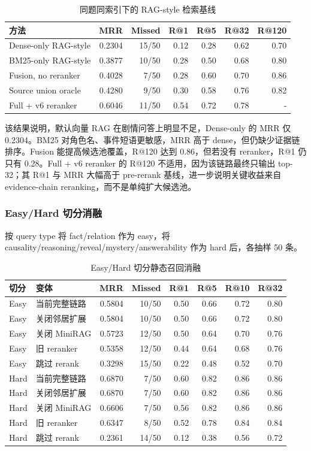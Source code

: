 \documentclass[UTF8,a4paper,12pt]{ctexart}
\begin{document}
\begin{table}[htbp]
\centering
\small
\begin{tabular}{lrrrrrr}
\toprule
方法 & MRR & Missed & R@1 & R@5 & R@32 & R@120 \\
\midrule
Dense-only RAG-style & 0.2304 & 15/50 & 0.12 & 0.28 & 0.62 & 0.70 \\
BM25-only RAG-style & 0.3877 & 10/50 & 0.28 & 0.50 & 0.68 & 0.80 \\
Fusion, no reranker & 0.4028 & 7/50 & 0.28 & 0.60 & 0.70 & 0.86 \\
Source union oracle & 0.4280 & 9/50 & 0.30 & 0.58 & 0.76 & 0.82 \\
Full + v6 reranker & 0.6046 & 11/50 & 0.54 & 0.72 & 0.78 & - \\
\bottomrule
\end{tabular}
\caption{同题同索引下的 RAG-style 检索基线}
\end{table}

该结果说明，默认向量 RAG 在剧情问答上明显不足，Dense-only 的 MRR 仅 0.2304。BM25 对角色名、事件短语更敏感，MRR 高于 dense，但仍缺少证据链排序。Fusion 能提高候选池覆盖，R@120 达到 0.86，但若没有 reranker，R@1 仍只有 0.28。Full + v6 reranker 的 R@120 不适用，因为该链路最终只输出 top-32；其 R@1 与 MRR 大幅高于 pre-rerank 基线，进一步说明关键收益来自 evidence-chain reranking，而不是单纯扩大候选池。

\subsubsection{Easy/Hard 切分消融}

按 query type 将 fact/relation 作为 easy，将 causality/reasoning/reveal/mystery/answerability 作为 hard 后，各抽样 50 条。

\begin{table}[htbp]
\centering
\small
\begin{tabular}{llrrrrrr}
\toprule
切分 & 变体 & MRR & Missed & R@1 & R@5 & R@10 & R@32 \\
\midrule
Easy & 当前完整链路 & 0.5804 & 10/50 & 0.50 & 0.66 & 0.72 & 0.80 \\
Easy & 关闭邻居扩展 & 0.5804 & 10/50 & 0.50 & 0.66 & 0.72 & 0.80 \\
Easy & 关闭 MiniRAG & 0.5723 & 12/50 & 0.50 & 0.64 & 0.70 & 0.76 \\
Easy & 旧 reranker & 0.5358 & 12/50 & 0.44 & 0.64 & 0.68 & 0.76 \\
Easy & 跳过 rerank & 0.3298 & 15/50 & 0.22 & 0.48 & 0.52 & 0.70 \\
Hard & 当前完整链路 & 0.6870 & 7/50 & 0.60 & 0.82 & 0.86 & 0.86 \\
Hard & 关闭邻居扩展 & 0.6870 & 7/50 & 0.60 & 0.82 & 0.86 & 0.86 \\
Hard & 关闭 MiniRAG & 0.6606 & 7/50 & 0.56 & 0.82 & 0.86 & 0.86 \\
Hard & 旧 reranker & 0.6347 & 8/50 & 0.52 & 0.78 & 0.84 & 0.84 \\
Hard & 跳过 rerank & 0.2361 & 14/50 & 0.12 & 0.38 & 0.56 & 0.72 \\
\bottomrule
\end{tabular}
\caption{Easy/Hard 切分静态召回消融}
\end{table}
\end{document}
